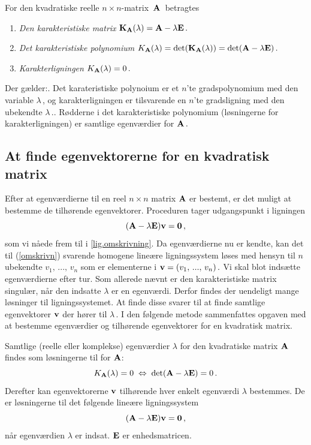 \begin{theorem}\label{karakteristiskP}
For den kvadratiske reelle $n \times n$-matrix $\,\mathbf{A}\,$ betragtes 
\begin{enumerate}
\item \textit{Den karakteristiske matrix} $ \mathbf K_{\mathbf{A}}(\lambda) = \mathbf{A} - \lambda \mathbf{E} \,.$
\item \textit{Det karakteristiske polynomium} $ K_{\mathbf{A}}(\lambda) = \det(\mathbf{K}_{\mathbf{A}}(\lambda)) = \det(\mathbf{A} - \lambda \mathbf{E})\,. $
\item \textit{Karakterligningen} $ K_{\mathbf{A}}(\lambda) = 0\,.$
\end{enumerate}

Der gælder:. Det karateristiske polynoium er et $n$'te gradspolynomium med den variable $\lambda\,$, og karakterligningen er tilsvarende en $n$'te gradsligning med den ubekendte $\lambda\,.$. Rødderne i det karakteristiske polynomium (løsningerne for karakterligningen) er samtlige egenværdier for $ \mathbf{A}\,.$
\end{theorem}

\subsection{At finde egenvektorerne for en kvadratisk matrix}

Efter at egenværdierne til en reel $n\times n$ matrix $\mathbf{A}$ er bestemt, er det muligt at bestemme de tilhørende egenvektorer. Proceduren tager udgangspunkt i ligningen
\begin{equation}\label{omskrivn}
(\mathbf{A} - \lambda \mathbf{E}) \mathbf{v} = \bm{0} \,,
\end{equation}
som vi nåede frem til i \eqref{lig.omskrivning}. Da egenværdierne nu er kendte, kan det til (\ref{omskrivn}) svarende homogene lineære ligningssystem løses med hensyn til $n$ ubekendte $v_1,\,...,\,v_n$ som er elementerne i $\mathbf{v}=(v_1,\,...,\,v_n)\,.$ Vi skal blot indsætte  egenværdierne efter tur. Som allerede nævnt er den karakteristiske matrix singulær, når den indsatte $ \lambda $ er en egenværdi. Derfor findes der uendeligt mange løsninger til ligningssystemet. At finde disse svarer til at finde samtlige egenvektorer $\mathbf{v}$ der hører til $\lambda\,.$\bs 
I den følgende metode sammenfattes opgaven med at bestemme egenværdier og tilhørende egenvektorer for en kvadratisk matrix.

\begin{method} \label{met.eg}
Samtlige (reelle eller komplekse) egenværdier $ \lambda $ for den kvadratiske matrix $ \mathbf{A} $ findes som løsningerne til  for $ \mathbf{A} $:
\begin{equation}
K_{\mathbf{A}}(\lambda) = 0 \; \Leftrightarrow \; \det(\mathbf{A} - \lambda \mathbf{E}) = 0 \, .
\end{equation}
Derefter kan egenvektorerne $ \mathbf{v} $ tilhørende hver enkelt egenværdi $ \lambda $ bestemmes. De er løsningerne til det følgende lineære ligningssystem
\begin{equation}
(\mathbf{A} - \lambda \mathbf{E}) \mathbf{v} =  \bm{0} \,,
\end{equation}
når egenværdien $\lambda$ er indsat. $ \mathbf{E} $ er enhedsmatricen.
\end{method}

